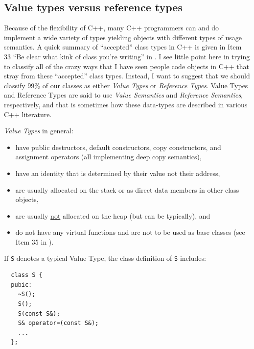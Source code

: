 \documentclass[pdf,ps2pdf,11pt]{SANDreport}
\begin{document}
%
{}\subsection{Value types versus reference types}
\label{sec:value-and-reference-types}
%

Because of the flexibility of C++, many C++ programmers can and do
implement a wide variety of types yielding objects with different types
of usage semantics.  A quick summary of ``accepted'' class types in
C++ is given in Item 33 ``Be clear what kink of class you're writing''
in {}\cite{C++CodingStandards05}.  I see little point here in trying
to classify all of the crazy ways that I have seen people code objects
in C++ that stray from these ``accepted'' class types.  Instead, I
want to suggest that we should classify 99\% of our classes as either
{}\textit{Value Types} or {}\textit{Reference Types}.  Value Types and
Reference Types are said to use {}\textit{Value Semantics} and
{}\textit{Reference Semantics}, respectively, and that is sometimes
how these data-types are described in various C++ literature.

{}\textit{Value Types} in general:

\begin{itemize}

{}\item have public destructors, default constructors, copy
constructors, and assignment operators (all implementing deep copy
semantics),

{}\item have an identity that is determined by their value not their
address,

{}\item are usually allocated on the stack or as direct data members
in other class objects,

{}\item are usually {}\underline{not} allocated on the heap (but can
be typically), and

{}\item do not have any virtual functions and are not to be used as
base classes (see Item 35 in {}\cite{C++CodingStandards05}).

\end{itemize}

If {}\texttt{S} denotes a typical Value Type, the class definition of
{}\texttt{S} includes:

{\small\begin{verbatim}
  class S {
  pubic:
    ~S();
    S();
    S(const S&);
    S& operator=(const S&);
    ...
  };
\end{verbatim}}
\end{document}
